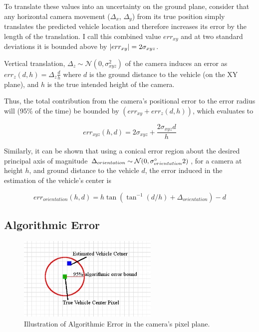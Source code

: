\documentclass[a4paper,12pt,twoside,openright]{report}
\begin{document}


To translate these values into an uncertainty on the ground plane, consider that
any horizontal camera movement ($\Delta_{x}$, $\Delta_{y}$) from its true position simply translates
the predicted vehicle location and therefore increases its error by the length of the translation.
I call this combined value $err_{xy}$ and at two standard deviations it is bounded above by
$\abs{err_{xy}} = 2\sigma_{xyz}$.

Vertical translation, $\Delta_z\sim \mathcal{N}(0, \sigma_{xyz}^2)$
of the camera induces an error as $err_{z}(d, h) = \Delta_z \frac{d}{h}$ %
where $d$ is the ground distance to the vehicle (on the XY plane), and $h$ is the true intended
height of the camera.

Thus, the total contribution from the camera's positional error to the error radius
will (95\% of the time) be bounded by $(err_{xy} + err_{z}(d, h))$, which evaluates to

\[ err_{xyz}(h, d) = 2\sigma_{xyz} + \frac{2\sigma_{xyz}d}{h} \]

Similarly, it can be shown that using a conical error region about the desired principal axis
of magnitude $\Delta_{orientation} \sim \mathcal{N}(0,\sigma_{orientation}\degree2)$, 
for a camera at height $h$, and ground distance to the vehicle $d$, the
error induced in the estimation of the vehicle's center is 

\[ err_{orientation}(h, d) = h\tan(\tan^{-1}(d/h) + \Delta_{orientation}) - d \] %




\subsection{Algorithmic Error}

\begin{figure}[h]
    \centering
    \includegraphics[width=0.6\textwidth]{figures/camera/alg_error.png}
    \caption[Algorithmic Error]{Illustration of Algorithmic Error in the camera's pixel plane.}
\end{figure}
\end{document}
